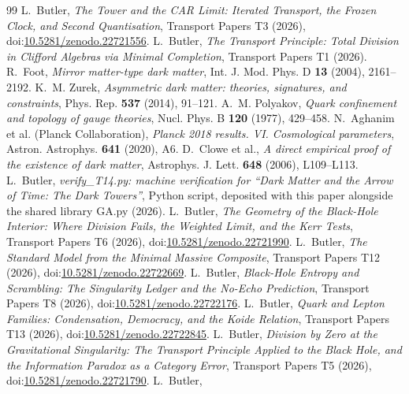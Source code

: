 \documentclass[11pt]{article}
\theoremstyle{definition}
\theoremstyle{plain}
\begin{document}
\begin{thebibliography}{99}
 L.~Butler,
\emph{The Tower and the CAR Limit: Iterated Transport, the Frozen Clock, and Second Quantisation},
Transport Papers T3 (2026), doi:\href{https://doi.org/10.5281/zenodo.22721556}{10.5281/zenodo.22721556}.
 L.~Butler,
\emph{The Transport Principle: Total Division in Clifford Algebras via Minimal Completion},
Transport Papers T1 (2026).
 R.~Foot,
\emph{Mirror matter-type dark matter},
Int. J. Mod. Phys. D \textbf{13} (2004), 2161--2192.
 K.~M. Zurek,
\emph{Asymmetric dark matter: theories, signatures, and constraints},
Phys. Rep. \textbf{537} (2014), 91--121.
 A.~M. Polyakov,
\emph{Quark confinement and topology of gauge theories},
Nucl. Phys. B \textbf{120} (1977), 429--458.
 N.~Aghanim et al. (Planck Collaboration),
\emph{Planck 2018 results. VI. Cosmological parameters},
Astron. Astrophys. \textbf{641} (2020), A6.
 D.~Clowe et al.,
\emph{A direct empirical proof of the existence of dark matter},
Astrophys. J. Lett. \textbf{648} (2006), L109--L113.
 L.~Butler,
\emph{verify\_T14.py: machine verification for ``Dark Matter and the Arrow of Time: The Dark Towers''},
Python script, deposited with this paper alongside the shared library GA.py (2026).
 L.~Butler,
\emph{The Geometry of the Black-Hole Interior: Where Division Fails, the Weighted Limit, and the Kerr Tests},
Transport Papers T6 (2026), doi:\href{https://doi.org/10.5281/zenodo.22721990}{10.5281/zenodo.22721990}.
 L.~Butler,
\emph{The Standard Model from the Minimal Massive Composite},
Transport Papers T12 (2026), doi:\href{https://doi.org/10.5281/zenodo.22722669}{10.5281/zenodo.22722669}.
 L.~Butler,
\emph{Black-Hole Entropy and Scrambling: The Singularity Ledger and the No-Echo Prediction},
Transport Papers T8 (2026), doi:\href{https://doi.org/10.5281/zenodo.22722176}{10.5281/zenodo.22722176}.
 L.~Butler,
\emph{Quark and Lepton Families: Condensation, Democracy, and the Koide Relation},
Transport Papers T13 (2026), doi:\href{https://doi.org/10.5281/zenodo.22722845}{10.5281/zenodo.22722845}.
 L.~Butler,
\emph{Division by Zero at the Gravitational Singularity: The Transport Principle Applied to the Black Hole, and the Information Paradox as a Category Error},
Transport Papers T5 (2026), doi:\href{https://doi.org/10.5281/zenodo.22721790}{10.5281/zenodo.22721790}.
 L.~Butler,

\end{thebibliography}
\end{document}
